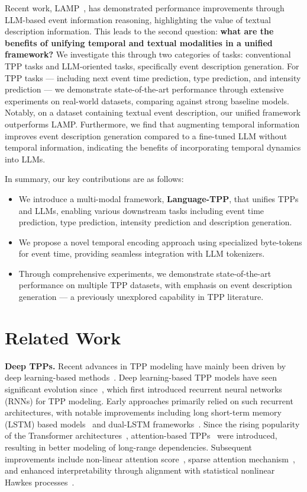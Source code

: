 Recent work, LAMP~\citep{shi2024language}, has demonstrated performance improvements through LLM-based event information reasoning, highlighting the value of textual description information. This leads to the second question: \textbf{what are the benefits of unifying temporal and textual modalities in a unified framework?} We investigate this through two categories of tasks: conventional TPP tasks and LLM-oriented tasks, specifically event description generation. For TPP tasks --- including next event time prediction, type prediction, and intensity prediction --- we demonstrate state-of-the-art performance through extensive experiments on real-world datasets, comparing against strong baseline models. Notably, on a dataset containing textual event description, our unified framework outperforms LAMP. Furthermore, we find that augmenting temporal information improves event description generation compared to a fine-tuned LLM without temporal information, indicating the benefits of incorporating temporal dynamics into LLMs. 

In summary, our key contributions are as follows:
\begin{itemize}
    \item We introduce a multi-modal framework, \textbf{Language-TPP}, that unifies TPPs and LLMs, enabling various downstream tasks including event time prediction, type prediction, intensity prediction and description generation.
    \item We propose a novel temporal encoding approach using specialized byte-tokens for event time, providing seamless integration with LLM tokenizers.
    \item Through comprehensive experiments, we demonstrate state-of-the-art performance on multiple TPP datasets, with emphasis on event description generation --- a previously unexplored capability in TPP literature.
\end{itemize}

\section{Related Work}\label{sec:related_work}
\textbf{Deep TPPs.} Recent advances in TPP modeling have mainly been driven by deep learning-based methods~\citep{du2016recurrent,mei2017neural,Mishra2018ModelingPopularity,shchur2019intensity,mei2021transformer,kong2023interval}. 
Deep learning-based TPP models have seen significant evolution since~\citep{du2016recurrent}, which first introduced recurrent neural networks (RNNs) for TPP modeling. Early approaches primarily relied on such recurrent architectures, with notable improvements including long short-term memory (LSTM) based models~\citep{mei2017neural} and dual-LSTM frameworks~\citep{xiao2017modeling}. Since the rising popularity of the Transformer architectures~\citep{vaswani2017attention}, attention-based TPPs~\citep{zuo2020transformer,zhang2020self} were introduced, resulting in better modeling of long-range dependencies. Subsequent improvements include non-linear attention score~\citep{zhu2021deep}, sparse attention mechanism~\citep{li2023sparse}, and enhanced interpretability through alignment with statistical nonlinear Hawkes processes~\citep{meng2024interpretable}. 

